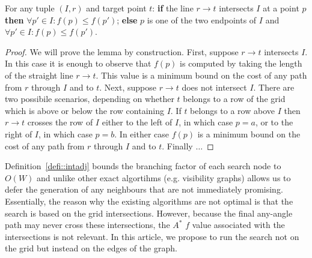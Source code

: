 \begin{lemm}
For any tuple $(I, r)$ and target point $t$: 
\textbf{if} the line $r \rightarrow t$ intersects $I$ at a point
$p$ \textbf{then} $\forall p' \in I: f(p) \leq f(p')$;
\textbf{else}
$p$ is one of the two endpoints of $I$ and 
$\forall p' \in I: f(p) \leq f(p')$.
\end{lemm}
\begin{proof}
We will prove the lemma by construction. First, suppose
$r \rightarrow t$ intersects $I$.
In this case it is enough to observe that $f(p)$ is computed 
by taking the length of the straight line $r \rightarrow t$.
This value is a minimum bound on the cost of any path from $r$ 
through $I$ and to $t$.
Next, suppose $r \rightarrow t$ does not intersect $I$. 
There are two possibile scenarios, depending on whether $t$
belongs to a row of the grid which is above or below the row
containing $I$.
If $t$ belongs to a row above $I$ then $r \rightarrow t$
crosses the row of $I$ either to the left of $I$, in which
case $p = a$, or to the right of $I$, in which case $p = b$.
In either case $f(p)$ is a minimum bound on the cost of any
path from $r$ through $I$ and to $t$.
Finally $\ldots$
\end{proof}
%

Definition~\ref{defi::intadj} bounds the branching factor of each 
search node to $O(W)$ and unlike other exact algortihms (e.g. visibility graphs)
allows us to defer the generation of any neighbours that are not 
immediately promising.
\\

Essentially, the reason why the existing algorithms are not optimal
is that the search is based on the grid intersections.  
However, because the final any-angle path 
may never cross these intersections, 
the $A^*$ $f$ value associated with the intersections
is not relevant.  
In this article, we propose to run the search not on the grid 
but instead on the edges of the graph.  

